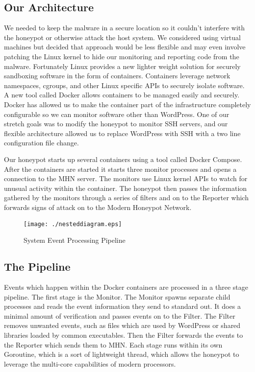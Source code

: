 \documentclass[10pt,conference,draftclsnofoot,onecolumn]{IEEEtran}
\begin{document}
\subsection{Our Architecture}
We needed to keep the malware in a secure location so it couldn’t interfere with the honeypot or otherwise attack the host system. We considered using virtual machines but decided that approach would be less flexible and may even involve patching the Linux kernel to hide our monitoring and reporting code from the malware. Fortunately Linux provides a new lighter weight solution for securely sandboxing software in the form of containers. Containers leverage network namespaces, cgroups, and other Linux specific APIs to securely isolate software. A new tool called Docker allows containers to be managed easily and securely. Docker has allowed us to make the container part of the infrastructure completely configurable so we can monitor software other than WordPress. One of our stretch goals was to modify the honeypot to monitor SSH servers, and our flexible architecture allowed us to replace WordPress with SSH with a two line configuration file change.

Our honeypot starts up several containers using a tool called Docker Compose. After the containers are started it starts three monitor processes and opens a connection to the MHN server. The monitors use Linux kernel APIs to watch for unusual activity within the container. The honeypot then passes the information gathered by the monitors through a series of filters and on to the Reporter which forwards signs of attack on to the Modern Honeypot Network.

\begin{figure}[!ht]
\texttt{[image: ./nesteddiagram.eps]}
\caption{System Event Processing Pipeline}
\end{figure}



\subsection{The Pipeline}
Events which happen within the Docker containers are processed in a three stage pipeline. The first stage is the Monitor. The Monitor spawns separate child processes and reads the event information they send to standard out. It does a minimal amount of verification and passes events on to the Filter. The Filter removes unwanted events, such as files which are used by WordPress or shared libraries loaded by common executables. Then the Filter forwards the events to the Reporter which sends them to MHN. Each stage runs within its own Goroutine, which is a sort of lightweight thread, which allows the honeypot to leverage the multi-core capabilities of modern processors.
\end{document}
